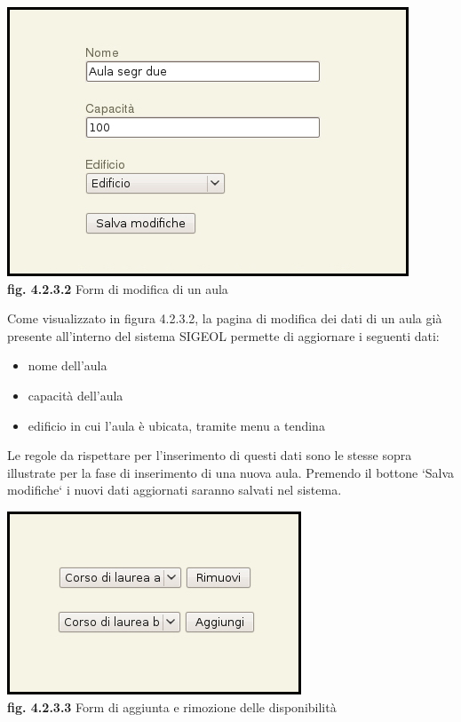 \documentclass[11pt,a4paper]{article}
\begin{document}
\bigskip
\begin{center}
	\includegraphics[scale=0.5]{images/modifica_aula.jpg}\\
	\textbf{fig. 4.2.3.2} Form di modifica di un aula\\
\end{center}
\bigskip

Come visualizzato in figura 4.2.3.2, la pagina di modifica dei dati di un aula già presente all'interno del sistema SIGEOL permette di aggiornare i seguenti dati:
\begin{itemize}
 \item nome dell'aula
 \item capacità dell'aula
 \item edificio in cui l'aula è ubicata, tramite menu a tendina
\end{itemize}
Le regole da rispettare per l'inserimento di questi dati sono le stesse sopra illustrate per la fase di inserimento di una nuova aula.
Premendo il bottone `Salva modifiche` i nuovi dati aggiornati saranno salvati nel sistema.

\bigskip
\begin{center}
	\includegraphics[scale=0.5]{images/modifica_aula_corso.jpg}\\
	\textbf{fig. 4.2.3.3} Form di aggiunta e rimozione delle disponibilità\\
\end{center}
\bigskip
\end{document}
